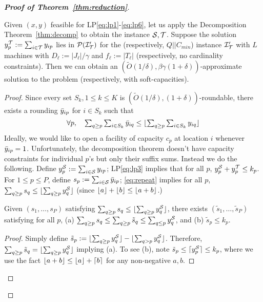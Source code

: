 \begin{proof}[{\bf Proof of Theorem~\ref{thm:reduction}}]
\begin{lemma}
	Given $(x,y)$ feasible for  LP\eqref{eq:lp1}-\eqref{eq:lp6}, let us apply the Decomposition Theorem~\ref{thm:decomp} to obtain the instance ${\cal S},{\cal T}$.
	Suppose the solution $y^{\cal T}_p := \sum_{i\in{\cal T}} y_{ip}$ lies in ${\cal P}({\cal I}'_{\cal T})$ for the \cckp (respectively, $Q||C_{min}$) instance ${\cal I}'_{\cal T}$ with $L$ machines with $D_\ell := |J_\ell|/\gamma$
	and $f_\ell := |T_\ell|$ (respectively, no cardinality constraints). Then we can obtain an $(\tilde{O}(1/\delta), \beta\gamma(1+\delta))$-approximate solution to the \mckc problem (respectively, with soft-capacities).
\end{lemma}
\begin{proof}
Since every set $S_k, 1\leq k\leq K$ is $(\tilde{O}(1/\delta),(1+\delta))$-roundable, there exists a rounding $\bar{y}_{ip}$ for $i\in S_k$  such that
\begin{equation}\label{eq:repeat}
\textstyle \forall p, ~~~ \sum_{q\geq p} \sum_{i\in S_k} \bar{y}_{iq} \leq \lfloor\sum_{q\geq p} \sum_{i\in S_k} y_{iq}\rfloor 
\end{equation}
\def\s{\tilde{s}}
Ideally, we would like to open a facility of capacity $c_p$ at location $i$ whenever $\bar{y}_{ip} = 1$. Unfortunately, the decomposition theorem doesn't have capacity constraints for individual $p$'s but only their suffix sums. Instead we do the following. Define $y^{{\cal S}}_p := \sum_{i\in {\cal S}} y_{ip}$; LP\eqref{eq:lp3} implies that for all $p$, $y^{\cal S}_p + y^{\cal T}_p \leq k_p$.
For $1\leq p\leq P$, define $s_p := \sum_{i\in {\cal S}} \bar{y}_{ip}$; \eqref{eq:repeat} implies for all $p$, $\sum_{q\geq p} s_q \leq \lfloor\sum_{q\geq p} y^{\cal S}_q\rfloor$ (since $\lfloor a\rfloor + \lfloor b\rfloor \leq \lfloor a+b\rfloor$.)
\begin{claim}\label{clm:massmovement}
	Given $(s_1,\ldots,s_P)$ satisfying $\sum_{q\geq p} s_q \leq \lfloor\sum_{q\geq p} y^{\cal S}_q\rfloor$, there exists $(\s_1,\ldots,\s_P)$ satisfying
	for all $p$, (a) $\sum_{q\geq p} s_q \leq \sum_{q\geq p} \s_q \leq \sum_{q\leq p} y^\calS_q$, and (b) $\s_p \leq k_p$.
\end{claim}
\begin{proof}
Simply define $\s_p := \floor{\sum_{q\geq p} y^\calS_q} - \floor{\sum_{q> p} y^\calS_q}$. Therefore, $\sum_{q\geq p} \s_q = \floor{\sum_{q\geq p} y^\calS_q}$ implying (a).
To see (b), note $\s_p \leq \ceil{y^\calS_p} \leq k_p$, where we use the fact $\lfloor a+b\rfloor \leq \lfloor a\rfloor + \lceil b\rceil$ for any non-negative $a,b$.
\end{proof}


\end{proof}
\end{proof}
